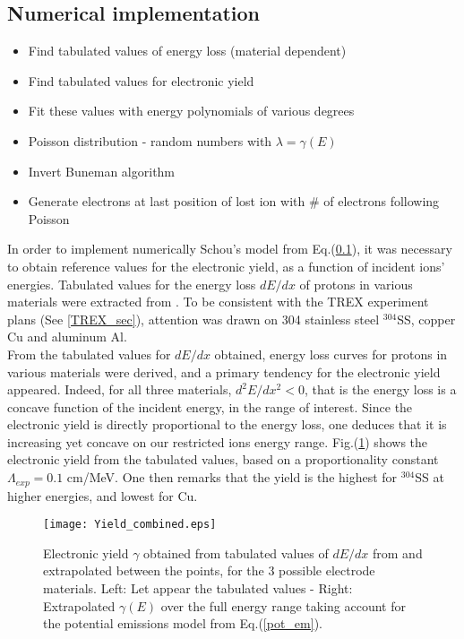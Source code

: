 \subsection{Numerical implementation}
\begin{itemize}
\item{Find tabulated values of energy loss (material dependent)}
\item{Find tabulated values for electronic yield}
\item{Fit these values with energy polynomials of various degrees}
\item{Poisson distribution - random numbers with $\lambda=\gamma(E)$}
\item{Invert Buneman algorithm}
\item{Generate electrons at last position of lost ion with \# of electrons following Poisson}
\end{itemize}



In order to implement numerically Schou's model from Eq.(\ref{}), it was necessary to obtain reference values for the electronic yield, as a function of incident ions' energies. Tabulated values for the energy loss $dE/dx$ of protons in various materials were extracted from \cite{Janni_vol1, Janni_vol2}. To be consistent with the TREX experiment plans (See \ref{TREX_sec}), attention was drawn on 304 stainless steel $^{304}$SS, copper Cu and aluminum Al.\\

\noindent From the tabulated values for $dE/dx$ obtained, energy loss curves for protons in various materials were derived, and a primary tendency for the electronic yield appeared. Indeed, for all three materials, $d^2E/dx^2<0$, that is the energy loss is a concave function of the incident energy, in the range of interest. Since the electronic yield is directly proportional to the energy loss, one deduces that it is increasing yet concave on our restricted ions energy range. Fig.(\ref{yield}) shows the electronic yield from the tabulated values, based on a proportionality constant $\Lambda_{exp}=0.1$ cm/MeV. One then remarks that the yield is the highest for $^{304}$SS at higher energies, and lowest for Cu. 

\begin{figure}[h!]
\centering
	\texttt{[image: Yield\_combined.eps]}
	\caption{\label{yield} Electronic yield $\gamma$ obtained from tabulated values of $dE/dx$ from \cite{Janni_vol1, Janni_vol2} and extrapolated between the points, for the 3 possible electrode materials. Left: Let appear the tabulated values - Right: Extrapolated $\gamma(E)$ over the full energy range taking account for the potential emissions model from Eq.(\ref{pot_em}).}
\end{figure}  

